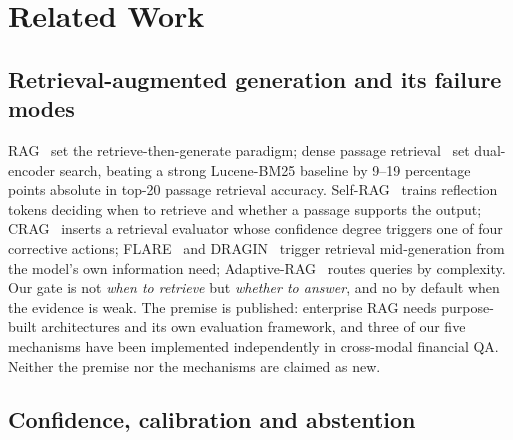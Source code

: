 \documentclass[conference]{IEEEtran}
\begin{document}
\section{Related Work}

\subsection{Retrieval-augmented generation and its failure modes}

RAG~\cite{lewis2020rag} set the retrieve-then-generate paradigm; dense passage
retrieval~\cite{karpukhin2020dpr} set dual-encoder search, beating a strong
Lucene-BM25 baseline by 9--19 percentage points absolute in top-20 passage
retrieval accuracy. Self-RAG~\cite{asai2024selfrag} trains reflection tokens
deciding when to retrieve and whether a passage supports the output;
CRAG~\cite{yan2024crag} inserts a retrieval evaluator whose confidence degree
triggers one of four corrective actions; FLARE~\cite{jiang2023flare} and
DRAGIN~\cite{su2024dragin} trigger retrieval mid-generation from the model's
own information need; Adaptive-RAG~\cite{jeong2024adaptive} routes queries by
complexity. Our gate is not \emph{when to retrieve} but \emph{whether to
answer}, and no by default when the evidence is weak. The premise is
published: enterprise RAG needs purpose-built architectures and its own
evaluation framework, and three of our five mechanisms have been implemented
independently in cross-modal financial QA. Neither the premise nor the
mechanisms are claimed as new.

\subsection{Confidence, calibration and abstention}
\end{document}
